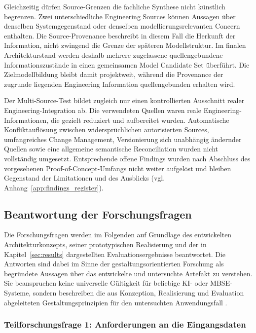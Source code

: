 Gleichzeitig dürfen Source-Grenzen die fachliche Synthese nicht künstlich
begrenzen. Zwei unterschiedliche Engineering Sources können Aussagen über
denselben Systemgegenstand oder denselben modellierungsrelevanten Concern
enthalten. Die Source-Provenance beschreibt in diesem Fall die Herkunft der
Information, nicht zwingend die Grenze der späteren Modellstruktur. Im
finalen Architekturstand werden deshalb mehrere zugelassene quellengebundene
Informationszustände in einen gemeinsamen Model Candidate Set überführt. Die
Zielmodellbildung bleibt damit projektweit, während die Provenance der
zugrunde liegenden Engineering Information quellengebunden erhalten wird.

Der Multi-Source-Test bildet zugleich nur einen kontrollierten Ausschnitt
realer Engineering-Integration ab. Die verwendeten Quellen waren reale 
Engineering-Informationen, die gezielt reduziert und aufbereitet wurden.
Automatische Konfliktauflösung zwischen widersprüchlichen autorisierten
Sources, umfangreiches Change Management, Versionierung sich unabhängig
ändernder Quellen sowie eine allgemeine semantische Reconciliation wurden
nicht vollständig umgesetzt. Entsprechende offene Findings wurden nach
Abschluss des vorgesehenen Proof-of-Concept-Umfangs nicht weiter aufgelöst
und bleiben Gegenstand der Limitationen und des Ausblicks
(vgl. Anhang~\ref{app:findings_register}).

\subsection{Beantwortung der Forschungsfragen}
\label{sec:discussion_research_questions}

Die Forschungsfragen werden im Folgenden auf Grundlage des entwickelten
Architekturkonzepts, seiner prototypischen Realisierung und der in
Kapitel~\ref{sec:results} dargestellten Evaluationsergebnisse beantwortet.
Die Antworten sind dabei im Sinne der gestaltungsorientierten Forschung als
begründete Aussagen über das entwickelte und untersuchte Artefakt zu verstehen.
Sie beanspruchen keine universelle Gültigkeit für beliebige
KI- oder MBSE-Systeme, sondern beschreiben die aus Konzeption, Realisierung
und Evaluation abgeleiteten Gestaltungsprinzipien für den untersuchten
Anwendungsfall \cite{Wieringa2014,ISO42030}.


\subsubsection{Teilforschungsfrage 1: Anforderungen an die Eingangsdaten}
\label{sec:discussion_rq1}

